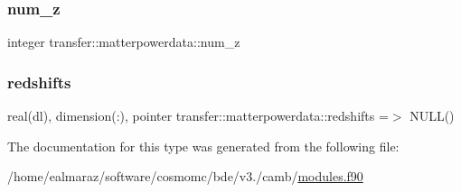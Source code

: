 \mbox{\label{structtransfer_1_1matterpowerdata_adbda458a03ffc105a91a31d77c0b2a24}} 
\subsubsection{\texorpdfstring{num\+\_\+z}{num\_z}}
{\footnotesize\ttfamily integer transfer\+::matterpowerdata\+::num\+\_\+z}

\mbox{\label{structtransfer_1_1matterpowerdata_ab6d55f419aaed4c08e8e64f386d600c9}} 
\subsubsection{\texorpdfstring{redshifts}{redshifts}}
{\footnotesize\ttfamily real(dl), dimension(\+:), pointer transfer\+::matterpowerdata\+::redshifts =$>$ N\+U\+LL()}



The documentation for this type was generated from the following file\+:\begin{DoxyCompactItemize}
\item 
/home/ealmaraz/software/cosmomc/bde/v3./camb/\mbox{\hyperlink{modules_8f90}{modules.\+f90}}\end{DoxyCompactItemize}
